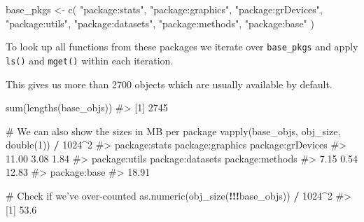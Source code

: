 \documentclass[
]{krantz}
\makeatletter
\newenvironment{Shaded}{\begin{snugshade}}{\end{snugshade}}
\newcommand{\CommentTok}[1]{\textcolor[rgb]{0.56,0.35,0.01}{\textit{#1}}}
\newcommand{\ControlFlowTok}[1]{\textcolor[rgb]{0.13,0.29,0.53}{\textbf{#1}}}
\newcommand{\DataTypeTok}[1]{\textcolor[rgb]{0.13,0.29,0.53}{#1}}
\newcommand{\DecValTok}[1]{\textcolor[rgb]{0.00,0.00,0.81}{#1}}
\newcommand{\KeywordTok}[1]{\textcolor[rgb]{0.13,0.29,0.53}{\textbf{#1}}}
\newcommand{\NormalTok}[1]{#1}
\newcommand{\OperatorTok}[1]{\textcolor[rgb]{0.81,0.36,0.00}{\textbf{#1}}}
\newcommand{\OtherTok}[1]{\textcolor[rgb]{0.56,0.35,0.01}{#1}}
\newcommand{\StringTok}[1]{\textcolor[rgb]{0.31,0.60,0.02}{#1}}
\newenvironment{kframe}{%
\medskip{}
\setlength{\fboxsep}{.8em}
 \def\at@end@of@kframe{}%
 \ifinner\ifhmode%
  \def\at@end@of@kframe{\end{minipage}}%
  \begin{minipage}{\columnwidth}%
 \fi\fi%
 \def\FrameCommand##1{\hskip\@totalleftmargin \hskip-\fboxsep
 \colorbox{shadecolor}{##1}\hskip-\fboxsep
     \hskip-\linewidth \hskip-\@totalleftmargin \hskip\columnwidth}%
 \MakeFramed {\advance\hsize-\width
   \@totalleftmargin\z@ \linewidth\hsize
   \@setminipage}}%
 {\par\unskip\endMakeFramed%
 \at@end@of@kframe}
\renewenvironment{Shaded}{\begin{kframe}}{\end{kframe}}
\renewcommand{\KeywordTok} [1]{\textcolor[rgb]{0.00,0.44,0.13}{{#1}}}
\renewcommand{\DataTypeTok}[1]{\textcolor[rgb]{0.56,0.13,0.00}{{#1}}}
\renewcommand{\DecValTok}  [1]{\textcolor[rgb]{0.25,0.63,0.44}{{#1}}}
\renewcommand{\StringTok}  [1]{\textcolor[rgb]{0.25,0.44,0.63}{{#1}}}
\renewcommand{\CommentTok} [1]{\textcolor[rgb]{0.38,0.63,0.69}{{#1}}}
\renewcommand{\OtherTok}   [1]{\textcolor[rgb]{0.00,0.44,0.13}{{#1}}}
\renewcommand{\NormalTok}  [1]{{#1}}
\makeatother
\begin{document}
\begin{Shaded}
\begin{Highlighting}[]
\NormalTok{base_pkgs <-}\StringTok{ }\KeywordTok{c}\NormalTok{(}
  \StringTok{"package:stats"}\NormalTok{, }\StringTok{"package:graphics"}\NormalTok{, }\StringTok{"package:grDevices"}\NormalTok{,}
  \StringTok{"package:utils"}\NormalTok{, }\StringTok{"package:datasets"}\NormalTok{, }\StringTok{"package:methods"}\NormalTok{,}
  \StringTok{"package:base"}
\NormalTok{)}
\end{Highlighting}
\end{Shaded}

To look up all functions from these packages we iterate over \texttt{base\_pkgs} and apply \texttt{ls()} and \texttt{mget()} within each iteration.

\begin{Shaded}
\end{Shaded}

This gives us more than 2700 objects which are usually available by default.

\begin{Shaded}
\begin{Highlighting}[]
\KeywordTok{sum}\NormalTok{(}\KeywordTok{lengths}\NormalTok{(base_objs))}
\CommentTok{#> [1] 2745}

\CommentTok{# We can also show the sizes in MB per package}
\KeywordTok{vapply}\NormalTok{(base_objs, obj_size, }\KeywordTok{double}\NormalTok{(}\DecValTok{1}\NormalTok{)) }\OperatorTok{/}\StringTok{ }\DecValTok{1024}\OperatorTok{^}\DecValTok{2}
\CommentTok{#>     package:stats  package:graphics package:grDevices }
\CommentTok{#>             11.00              3.08              1.84 }
\CommentTok{#>     package:utils  package:datasets   package:methods }
\CommentTok{#>              7.15              0.54             12.83 }
\CommentTok{#>      package:base }
\CommentTok{#>             18.91}

\CommentTok{# Check if we've over-counted}
\KeywordTok{as.numeric}\NormalTok{(}\KeywordTok{obj_size}\NormalTok{(}\OperatorTok{!!!}\NormalTok{base_objs)) }\OperatorTok{/}\StringTok{ }\DecValTok{1024}\OperatorTok{^}\DecValTok{2}
\CommentTok{#> [1] 53.6}
\end{Highlighting}
\end{Shaded}
\end{document}
